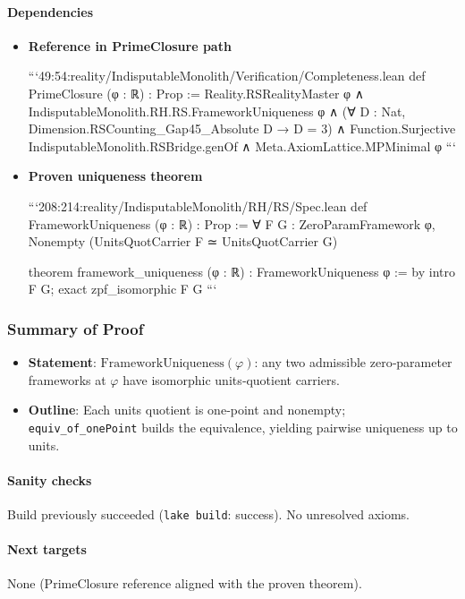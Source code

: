 \documentclass{article}
\begin{document}
\paragraph{Dependencies}
\begin{itemize}[leftmargin=*]
  \item \textbf{Reference in PrimeClosure path}

```49:54:reality/IndisputableMonolith/Verification/Completeness.lean
def PrimeClosure (φ : ℝ) : Prop :=
  Reality.RSRealityMaster φ ∧
  IndisputableMonolith.RH.RS.FrameworkUniqueness φ ∧
  (∀ D : Nat, Dimension.RSCounting_Gap45_Absolute D → D = 3) ∧
  Function.Surjective IndisputableMonolith.RSBridge.genOf ∧
  Meta.AxiomLattice.MPMinimal φ
```

  \item \textbf{Proven uniqueness theorem}

```208:214:reality/IndisputableMonolith/RH/RS/Spec.lean
def FrameworkUniqueness (φ : ℝ) : Prop :=
  ∀ F G : ZeroParamFramework φ, Nonempty (UnitsQuotCarrier F ≃ UnitsQuotCarrier G)

theorem framework_uniqueness (φ : ℝ) : FrameworkUniqueness φ := by
  intro F G; exact zpf_isomorphic F G
```
\end{itemize}

\subsubsection{Summary of Proof}
\begin{itemize}[leftmargin=*]
  \item \textbf{Statement}: \(\mathrm{FrameworkUniqueness}(φ)\): any two admissible zero‑parameter frameworks at \(φ\) have isomorphic units‑quotient carriers.
  \item \textbf{Outline}: Each units quotient is one‑point and nonempty; \texttt{equiv\_of\_onePoint} builds the equivalence, yielding pairwise uniqueness up to units.
\end{itemize}

\paragraph{Sanity checks}
Build previously succeeded (\texttt{lake build}: success). No unresolved axioms.

\paragraph{Next targets} None (PrimeClosure reference aligned with the proven theorem).
\end{document}
